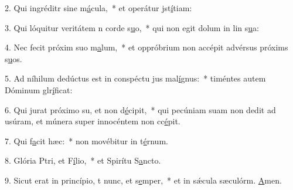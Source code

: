 2. Qui ingréditr sine m\uline{á}cula,~* et operátur jst\uline{í}tiam:\par 
3. Qui lóquitur veritátem n corde s\uline{u}o,~* qui non egit dolum in lin s\uline{u}a:\par 
4. Nec fecit próxim suo m\uline{a}lum,~* et oppróbrium non accépit advérsus próxims s\uline{u}os.\par 
5. Ad níhilum dedúctus est in conspéctu jus mal\uline{í}gnus:~* timéntes autem Dóminum glr\uline{í}ficat:\par 
6. Qui jurat próximo su, et non d\uline{é}cipit,~* qui pecúniam suam non dedit ad usúram, et múnera super innocéntem non cc\uline{é}pit.\par 
7. Qui f\uline{a}cit hæc:~* non movébitur in t\uline{é}rnum.\par 
8. Glória Ptri, et F\uline{í}lio,~* et Spirítu S\uline{a}ncto.\par 
9. Sicut erat in princípio, t nunc, et s\uline{e}mper,~* et in sǽcula sæculórm. \uline{A}men.\par 
